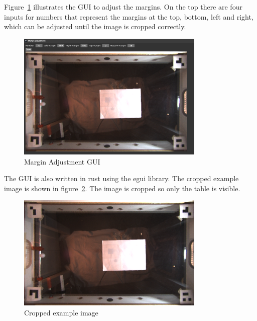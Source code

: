 Figure~\ref{fig:margin_adj_gui} illustrates the GUI to adjust the margins.
On the top there are four inputs for numbers that represent the margins at the top, bottom, left and right, which can be adjusted until the image is cropped correctly.
\begin{figure}[H]
    \centering
    \includegraphics[width=0.8\textwidth]{../photos/margin_adj_gui}
    \caption[marginadjgui]{Margin Adjustment GUI}
    \label{fig:margin_adj_gui}
\end{figure}
The GUI is also written in rust using the egui\autocite{egui} library.
The cropped example image is shown in figure~\ref{fig:example8_cropped}.
The image is cropped so only the table is visible.
\begin{figure}[H]
    \centering
    \includegraphics[width=0.8\textwidth]{../photos/output12_cropped}
    \caption[croppedexampleimage]{Cropped example image}
    \label{fig:example8_cropped}
\end{figure}


